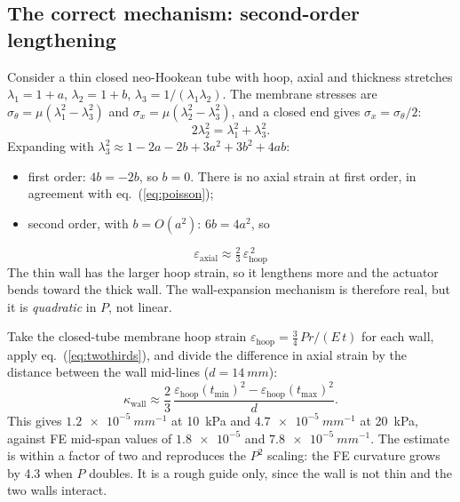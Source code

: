 \documentclass[11pt,a4paper]{article}
\numberwithin{equation}{section}
\newcommand{\tmin}{t_{\min}}
\newcommand{\tmax}{t_{\max}}
\begin{document}
\subsection{The correct mechanism: second-order lengthening}
Consider a thin closed neo-Hookean tube with hoop, axial and thickness stretches $\lambda_1=1+a$, $\lambda_2=1+b$, $\lambda_3=1/(\lambda_1\lambda_2)$.
The membrane stresses are $\sigma_\theta=\mu(\lambda_1^2-\lambda_3^2)$ and $\sigma_x=\mu(\lambda_2^2-\lambda_3^2)$, and a closed end gives $\sigma_x=\sigma_\theta/2$:
\begin{equation}
2\lambda_2^2 = \lambda_1^2 + \lambda_3^2 .
\end{equation}
Expanding with $\lambda_3^2 \approx 1-2a-2b+3a^2+3b^2+4ab$:
\begin{itemize}[nosep]
\item first order: $4b = -2b$, so $b=0$. There is no axial strain at first order, in agreement with eq.~(\ref{eq:poisson});
\item second order, with $b=O(a^2)$: $6b = 4a^2$, so
\end{itemize}
\begin{equation}
\boxed{\;\varepsilon_{\text{axial}} \approx \tfrac{2}{3}\,\varepsilon_{\text{hoop}}^{\,2}\;} \label{eq:twothirds}
\end{equation}
The thin wall has the larger hoop strain, so it lengthens more and the actuator bends toward the thick wall. The
wall-expansion mechanism is therefore real, but it is \emph{quadratic} in $P$, not linear.

\begin{remark}
Take the closed-tube membrane hoop strain $\varepsilon_{\text{hoop}} = \tfrac{3}{4}\,P r/(E\,t)$ for each wall, apply eq.~(\ref{eq:twothirds}), and divide the difference in axial strain by the distance between
the wall mid-lines ($d = \SI{14}{mm}$):
\[
\kappa_{\text{wall}} \approx \frac{2}{3}\,\frac{\varepsilon_{\text{hoop}}(\tmin)^2-\varepsilon_{\text{hoop}}(\tmax)^2}{d}.
\]
This gives $\SI{1.2e-5}{mm^{-1}}$ at \SI{10}{kPa} and $\SI{4.7e-5}{mm^{-1}}$ at \SI{20}{kPa}, against FE mid-span values of
$\num{1.8e-5}$ and $\SI{7.8e-5}{mm^{-1}}$. The estimate is within a factor of two and reproduces the $P^2$ scaling: the FE curvature grows by 4.3 when $P$ doubles.
It is a rough guide only, since the wall is not thin and the two walls interact.
\end{remark}
\end{document}
